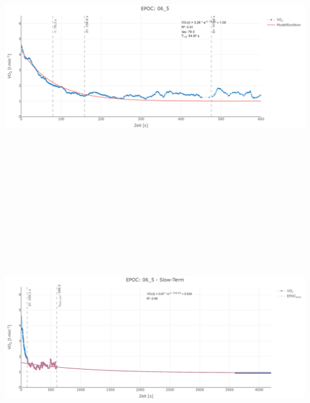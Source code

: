 \documentclass[
  letterpaper,
  DIV=11]{scrartcl}
\begin{document}
\includegraphics[width=11.45833in,height=4.6875in]{images/06_5_tau.png}
\includegraphics[width=11.45833in,height=4.6875in]{images/06_5_slow.png}
\end{document}

